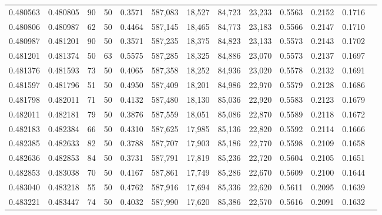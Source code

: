 \begin{tabular}{rrrrrrrrrrrrr}
0.480563 & 0.480805 &    90 &  50 &                                     0.3571 & 587,083 &  18,527 &  84,723 &  23,233 & 0.5563 & 0.2152 & 0.1716 \\
0.480806 & 0.480987 &    62 &  50 &                                     0.4464 & 587,145 &  18,465 &  84,773 &  23,183 & 0.5566 & 0.2147 & 0.1710 \\
0.480987 & 0.481201 &    90 &  50 &                                     0.3571 & 587,235 &  18,375 &  84,823 &  23,133 & 0.5573 & 0.2143 & 0.1702 \\
0.481201 & 0.481374 &    50 &  63 &                                     0.5575 & 587,285 &  18,325 &  84,886 &  23,070 & 0.5573 & 0.2137 & 0.1697 \\
0.481376 & 0.481593 &    73 &  50 &                                     0.4065 & 587,358 &  18,252 &  84,936 &  23,020 & 0.5578 & 0.2132 & 0.1691 \\
0.481597 & 0.481796 &    51 &  50 &                                     0.4950 & 587,409 &  18,201 &  84,986 &  22,970 & 0.5579 & 0.2128 & 0.1686 \\
0.481798 & 0.482011 &    71 &  50 &                                     0.4132 & 587,480 &  18,130 &  85,036 &  22,920 & 0.5583 & 0.2123 & 0.1679 \\
0.482011 & 0.482181 &    79 &  50 &                                     0.3876 & 587,559 &  18,051 &  85,086 &  22,870 & 0.5589 & 0.2118 & 0.1672 \\
0.482183 & 0.482384 &    66 &  50 &                                     0.4310 & 587,625 &  17,985 &  85,136 &  22,820 & 0.5592 & 0.2114 & 0.1666 \\
0.482385 & 0.482633 &    82 &  50 &                                     0.3788 & 587,707 &  17,903 &  85,186 &  22,770 & 0.5598 & 0.2109 & 0.1658 \\
0.482636 & 0.482853 &    84 &  50 &                                     0.3731 & 587,791 &  17,819 &  85,236 &  22,720 & 0.5604 & 0.2105 & 0.1651 \\
0.482853 & 0.483038 &    70 &  50 &                                     0.4167 & 587,861 &  17,749 &  85,286 &  22,670 & 0.5609 & 0.2100 & 0.1644 \\
0.483040 & 0.483218 &    55 &  50 &                                     0.4762 & 587,916 &  17,694 &  85,336 &  22,620 & 0.5611 & 0.2095 & 0.1639 \\
0.483221 & 0.483447 &    74 &  50 &                                     0.4032 & 587,990 &  17,620 &  85,386 &  22,570 & 0.5616 & 0.2091 & 0.1632 \\

\end{tabular}
